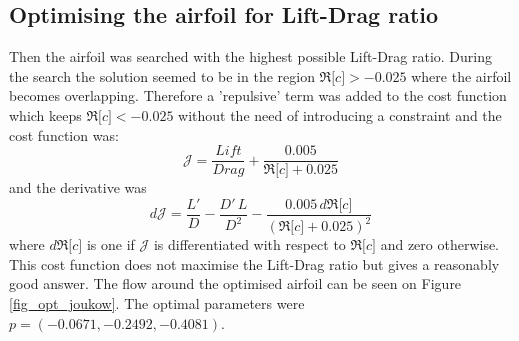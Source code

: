 \documentclass[12pt, a4paper]{article}
\begin{document}
    \subsection{Optimising the airfoil for Lift-Drag ratio}
        Then the airfoil was searched with the highest possible Lift-Drag ratio. During the search the solution seemed to be in the region $\Re \lbrack c \rbrack > -0.025$ where the airfoil becomes overlapping. Therefore a 'repulsive' term was added to the cost function which keeps $\Re \lbrack c \rbrack < -0.025$ without the need of introducing a constraint and the cost function was:
        \begin{equation}
            \mathcal{J} = \frac{Lift}{Drag} + \frac{0.005}{\Re \lbrack c \rbrack + 0.025}
        \end{equation}
        and the derivative was
        \begin{equation}
            d \mathcal{J} = \frac{L'}{D} - \frac{D' \, L}{D^2} - \frac{0.005 \, d \Re \lbrack c \rbrack }{(\Re \lbrack c \rbrack + 0.025)^2}
        \end{equation}
        where $d \Re \lbrack c \rbrack$ is one if $\mathcal{J}$ is differentiated with respect to $\Re \lbrack c \rbrack$ and zero otherwise. This cost function does not maximise the Lift-Drag ratio but gives a reasonably good answer. The flow around the optimised airfoil can be seen on Figure \ref{fig_opt_joukow}. The optimal parameters were $p = (-0.0671,-0.2492,-0.4081)$.
\end{document}
